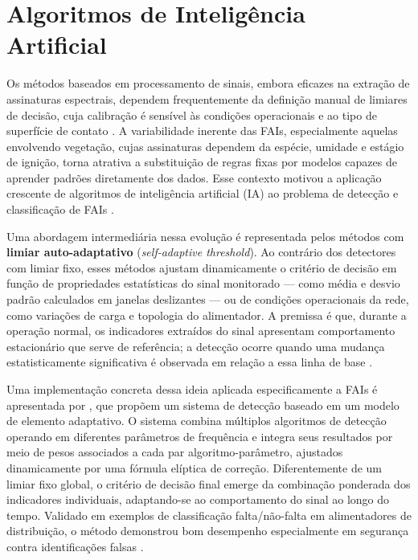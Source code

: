\section{Algoritmos de Inteligência Artificial}\label{sec:ia}

Os métodos baseados em processamento de sinais, embora eficazes na extração
de assinaturas espectrais, dependem frequentemente da definição manual de
limiares de decisão, cuja calibração é sensível às condições operacionais e ao
tipo de superfície de contato \cite{Aljohani2020, Sedighizadeh2010}. A
variabilidade inerente das FAIs, especialmente aquelas envolvendo
vegetação, cujas assinaturas dependem da espécie, umidade e estágio de
ignição, torna atrativa a substituição de regras fixas por modelos capazes
de aprender padrões diretamente dos dados. Esse contexto motivou a aplicação
crescente de algoritmos de inteligência artificial (IA) ao problema de
detecção e classificação de FAIs \cite{Aljohani2020}.

Uma abordagem intermediária nessa evolução é representada pelos métodos com
\textbf{limiar auto-adaptativo} (\textit{self-adaptive threshold}). Ao contrário
dos detectores com limiar fixo, esses métodos ajustam dinamicamente o critério de
decisão em função de propriedades estatísticas do sinal monitorado --- como média e
desvio padrão calculados em janelas deslizantes --- ou de condições operacionais da
rede, como variações de carga e topologia do alimentador. A premissa é que, durante
a operação normal, os indicadores extraídos do sinal apresentam comportamento
estacionário que serve de referência; a detecção ocorre quando uma mudança
estatisticamente significativa é observada em relação a essa linha de base
\cite{YuKhan1994, Sedighizadeh2010}.

Uma implementação concreta dessa ideia aplicada especificamente a FAIs é
apresentada por \cite{KimRussell1993}, que propõem um sistema de
detecção baseado em um modelo de elemento adaptativo. O sistema combina
múltiplos algoritmos de detecção operando em diferentes parâmetros de
frequência e integra seus resultados por meio de pesos associados a cada par
algoritmo-parâmetro, ajustados dinamicamente por uma fórmula elíptica de
correção. Diferentemente de um limiar fixo global, o critério de decisão
final emerge da combinação ponderada dos indicadores individuais, adaptando-se
ao comportamento do sinal ao longo do tempo. Validado em exemplos de
classificação falta/não-falta em alimentadores de distribuição, o método
demonstrou bom desempenho especialmente em segurança contra identificações
falsas \cite{KimRussell1993}.

